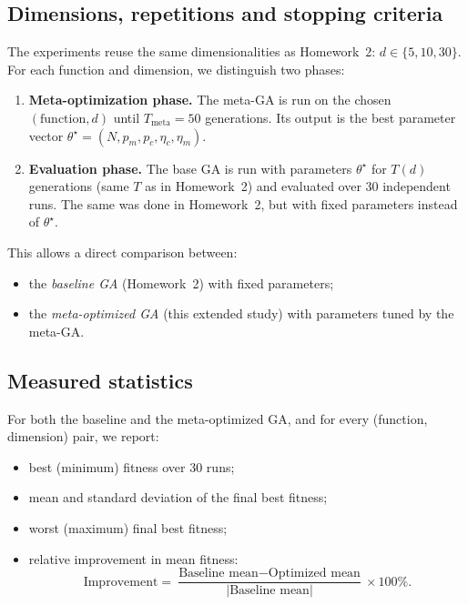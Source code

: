 \documentclass[11pt]{article}
\begin{document}
\subsection{Dimensions, repetitions and stopping criteria}

The experiments reuse the same dimensionalities as Homework~2:
$d \in \{5,10,30\}$.
For each function and dimension, we distinguish two phases:

\begin{enumerate}
  \item \textbf{Meta-optimization phase.}
        The meta-GA is run on the chosen $(\text{function},d)$ until
        $T_{\text{meta}}=50$ generations.
        Its output is the best parameter vector
        $\theta^\star = (N, p_m, p_c, \eta_c, \eta_m)$.

  \item \textbf{Evaluation phase.}
        The base GA is run with parameters $\theta^\star$ for
        $T(d)$ generations (same $T$ as in Homework~2) and evaluated over
        30 independent runs.
        The same was done in Homework~2, but with fixed parameters instead
        of $\theta^\star$.
\end{enumerate}

This allows a direct comparison between:
\begin{itemize}
  \item the \emph{baseline GA} (Homework~2) with fixed parameters;
  \item the \emph{meta-optimized GA} (this extended study) with parameters
        tuned by the meta-GA.
\end{itemize}

\subsection{Measured statistics}

For both the baseline and the meta-optimized GA, and for every
(function, dimension) pair, we report:
\begin{itemize}
  \item best (minimum) fitness over 30 runs;
  \item mean and standard deviation of the final best fitness;
  \item worst (maximum) final best fitness;
  \item relative improvement in mean fitness:
        \[
          \text{Improvement} =
          \frac{\text{Baseline mean} - \text{Optimized mean}} 
               {|\text{Baseline mean}|} \times 100\%.
        \]
\end{itemize}
\end{document}
